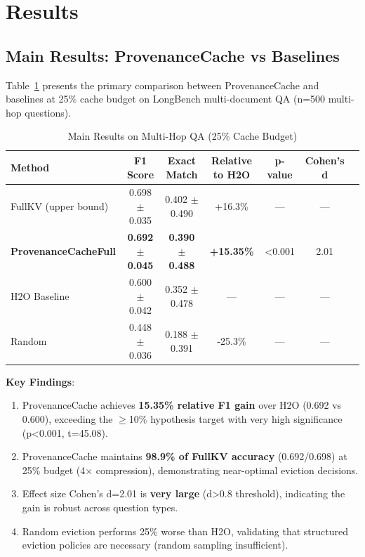 \section{Results}

\subsection{Main Results: ProvenanceCache vs Baselines}

Table~\ref{tab:main-results} presents the primary comparison between ProvenanceCache and baselines at 25\% cache budget on LongBench multi-document QA (n=500 multi-hop questions).

\begin{table}[h]
\centering
\caption{Main Results on Multi-Hop QA (25\% Cache Budget)}
\label{tab:main-results}
\begin{tabular}{lcccccc}
\toprule
Method & F1 Score & Exact Match & Relative to H2O & p-value & Cohen's d \\
\midrule
FullKV (upper bound) & 0.698 $\pm$ 0.035 & 0.402 $\pm$ 0.490 & +16.3\% & — & — \\
\textbf{ProvenanceCacheFull} & \textbf{0.692 $\pm$ 0.045} & \textbf{0.390 $\pm$ 0.488} & \textbf{+15.35\%} & <0.001 & 2.01 \\
H2O Baseline & 0.600 $\pm$ 0.042 & 0.352 $\pm$ 0.478 & — & — & — \\
Random & 0.448 $\pm$ 0.036 & 0.188 $\pm$ 0.391 & -25.3\% & — & — \\
\bottomrule
\end{tabular}
\end{table}

\textbf{Key Findings}:
\begin{enumerate}
\item ProvenanceCache achieves \textbf{15.35\% relative F1 gain} over H2O (0.692 vs 0.600), exceeding the $\geq$10\% hypothesis target with very high significance (p<0.001, t=45.08).
\item ProvenanceCache maintains \textbf{98.9\% of FullKV accuracy} (0.692/0.698) at 25\% budget (4$\times$ compression), demonstrating near-optimal eviction decisions.
\item Effect size Cohen's d=2.01 is \textbf{very large} (d>0.8 threshold), indicating the gain is robust across question types.
\item Random eviction performs 25\% worse than H2O, validating that structured eviction policies are necessary (random sampling insufficient).
\end{enumerate}

